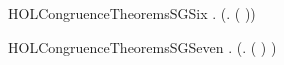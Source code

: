 \newcommand{\HOLCongruenceTheoremsSGFive}{\UseVerbatim{HOLCongruenceTheoremsSGFive}}
\begin{SaveVerbatim}{HOLCongruenceTheoremsSGSix}
\HOLTokenTurnstile{} \HOLSymConst{\HOLTokenForall{}} .   \HOLSymConst{\HOLTokenImp{}}  (\HOLTokenLambda{}. \HOLConst{\ensuremath{\nu}}  ( ))
\end{SaveVerbatim}
\newcommand{\HOLCongruenceTheoremsSGSix}{\UseVerbatim{HOLCongruenceTheoremsSGSix}}
\begin{SaveVerbatim}{HOLCongruenceTheoremsSGSeven}
\HOLTokenTurnstile{} \HOLSymConst{\HOLTokenForall{}} .   \HOLSymConst{\HOLTokenImp{}}  (\HOLTokenLambda{}.  ( ) )
\end{SaveVerbatim}
\newcommand{\HOLCongruenceTheoremsSGSeven}{\UseVerbatim{HOLCongruenceTheoremsSGSeven}}
